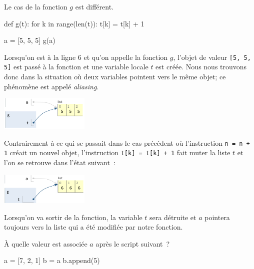 \documentclass{magnoliaold}
\begin{document}
Le cas de la fonction $g$ est différent. 

\begin{pythoncode}
def g(t):
    for k in range(len(t)):
        t[k] = t[k] + 1

a = [5, 5, 5]
g(a)
\end{pythoncode}
\noindent
Lorsqu'on est à la ligne 6 et qu'on appelle la fonction $g$, l'objet de valeur \verb![5, 5, 5]! est passé
à la fonction et une variable locale $t$ est créée. Nous nous trouvons donc dans la situation où deux variables
pointent vers le même objet; ce phénomène est appelé \emph{aliasing}.
\begin{center}
\includegraphics[width=0.32\textwidth]{../../commun/images/python-cours-tutor-7}
\end{center}
\noindent
Contrairement à ce qui se passait dans le cas précédent où l'instruction \verb!n = n + 1! créait un nouvel
objet, l'instruction \verb!t[k] = t[k] + 1! fait muter la liste $t$ et l'on se retrouve dans l'état
suivant~:
\begin{center}
\includegraphics[width=0.32\textwidth]{../../commun/images/python-cours-tutor-8}
\end{center}
\noindent Lorsqu'on va sortir de la fonction, la variable $t$ sera détruite et $a$ pointera toujours vers
la liste qui a été modifiée par notre fonction.
\vspace{2ex}
\begin{exoUnique}
\exo À quelle valeur est associée $a$ après le script suivant~?
\begin{pythoncode}
a = [7, 2, 1]
b = a
b.append(5)
\end{pythoncode}
\end{exoUnique}
\vspace{2ex}
\end{document}
